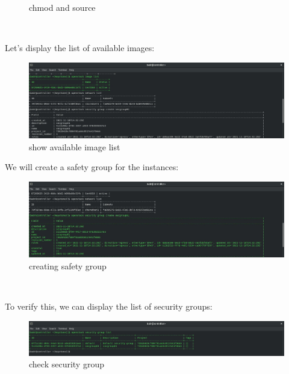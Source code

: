 \begin{spacing}{1.2}
\begin{figure}[!htb]
\begin{center}
\end{center} 
\caption{chmod and source} 
\end{figure} 
\FloatBarrier
\\



\par Let's display the list of available images: 
\\
\begin{figure}[!htb] 
\begin{center} 
\includegraphics[width=1\linewidth]{Cloud/Creating and Running Instances/show available image list} 
\end{center} 
\caption{show available image list} 
\end{figure} 
\FloatBarrier

\par We will create a safety group for the instances:
\\
\begin{figure}[!htb] 
\begin{center} 
\includegraphics[width=1\linewidth]{Cloud/Creating and Running Instances/creating safety group} 
\end{center} 
\caption{creating safety group} 
\end{figure} 
\FloatBarrier

\\\par To verify this, we can display the list of security groups: 
\\
\begin{figure}[!htb] 
\begin{center} 
\includegraphics[width=1\linewidth]{Cloud/Creating and Running Instances/check security group} 
\end{center} 
\caption{check security group} 
\end{figure} 
\FloatBarrier
\\


\end{spacing}
